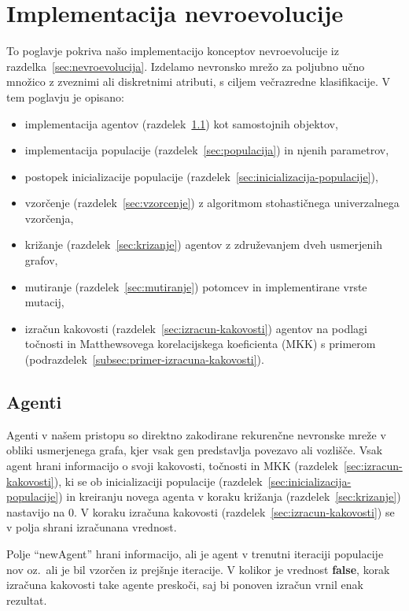 \documentclass[a4paper,12pt,openright]{book}
\begin{document}
    \chapter{Implementacija nevroevolucije}\label{ch:implementacija-nevroevolucije}
    To poglavje pokriva našo implementacijo konceptov nevroevolucije iz razdelka~\ref{sec:nevroevolucija}.
    Izdelamo nevronsko mrežo za poljubno učno množico z zveznimi ali diskretnimi atributi, s ciljem večrazredne klasifikacije.
    V tem poglavju je opisano:
    \begin{itemize}
        \item implementacija agentov (razdelek~\ref{sec:agenti}) kot samostojnih objektov,
        \item implementacija populacije (razdelek~\ref{sec:populacija}) in njenih parametrov,
        \item postopek inicializacije populacije (razdelek~\ref{sec:inicializacija-populacije}),
        \item vzorčenje (razdelek~\ref{sec:vzorcenje}) z algoritmom stohastičnega univerzalnega vzor\-če\-nja,
        \item križanje (razdelek~\ref{sec:krizanje}) agentov z združevanjem dveh usmerjenih grafov,
        \item mutiranje (razdelek~\ref{sec:mutiranje}) potomcev in implementirane vrste mutacij,
        \item izračun kakovosti (razdelek~\ref{sec:izracun-kakovosti}) agentov na podlagi točnosti in Matthewsovega korelacijskega koeficienta (MKK)
        s primerom (podrazdelek~\ref{subsec:primer-izracuna-kakovosti}).
    \end{itemize}

    \section{Agenti}\label{sec:agenti}
    Agenti v našem pristopu so direktno zakodirane rekurenčne nevronske mreže v obliki usmerjenega grafa, kjer vsak gen
    predstavlja povezavo ali vozlišče.
    Vsak agent hrani informacijo o svoji kakovosti, točnosti in MKK (razdelek~\ref{sec:izracun-kakovosti}), ki se ob inicializaciji populacije (razdelek~\ref{sec:inicializacija-populacije})
    in kreiranju novega agenta v koraku križanja (razdelek~\ref{sec:krizanje}) nastavijo na 0.
    V koraku izračuna kakovosti (razdelek~\ref{sec:izracun-kakovosti}) se v polja shrani izračunana vrednost.

    Polje \enquote{newAgent} hrani informacijo, ali je agent v trenutni iteraciji populacije nov oz.\ ali je bil vzorčen
    iz prejšnje iteracije.
    V kolikor je vrednost \textbf{false}, korak izračuna kakovosti take agente preskoči, saj bi ponoven izračun
    vrnil enak rezultat.
\end{document}
